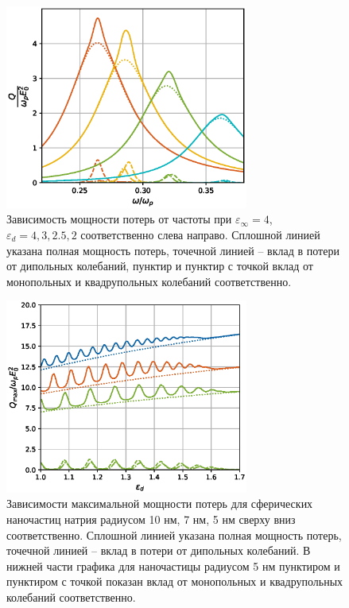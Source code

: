 \documentclass[12pt, a4paper]{article}
\def \eps {\varepsilon}
\begin{document}
\newpage
\begin{figure}[h]
	\centering
	\includegraphics[width=80mm]{./image/fig1_epsd4.eps}
	\caption{Зависимость мощности потерь от частоты при $\eps_\infty= 4$, $\eps_d = 4, 3, 2.5, 2$ соответственно слева направо. Сплошной линией указана полная мощность потерь, точечной линией – вклад в потери от дипольных колебаний, пунктир и пунктир с точкой вклад от монопольных и квадрупольных колебаний соответственно. }
	\label{fig1_epsd4}
\end{figure} 
\newpage
\begin{figure}[h]
	\centering
	\includegraphics[width=80mm]{./image/natr2.eps}
	\caption{Зависимости максимальной мощности потерь для сферических наночастиц натрия радиусом 10 нм, 7 нм, 5 нм сверху вниз соответственно. Сплошной линией указана полная мощность потерь, точечной линией – вклад в потери от дипольных колебаний. В нижней части графика для наночастицы радиусом 5 нм пунктиром и пунктиром с точкой показан вклад от монопольных и квадрупольных колебаний соответственно.}
	\label{natr}
\end{figure} 
\end{document}
